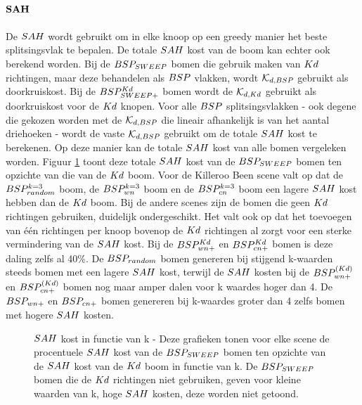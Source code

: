 \paragraph{$\mathbf{SAH}$}
De $\symSAH$ wordt gebruikt om in elke knoop op een greedy manier het beste splitsingsvlak te bepalen. De totale $\symSAH$ kost van de boom kan echter ook berekend worden. Bij de $BSP_{SWEEP}$ bomen die gebruik maken van $Kd$ richtingen, maar deze behandelen als $BSP$ vlakken, wordt $\mathcal{K}_{d,BSP}$ gebruikt als doorkruiskost. Bij de $BSP^{Kd}_{SWEEP+}$ bomen wordt de $\mathcal{K}_{d,Kd}$ gebruikt als doorkruiskost voor de $Kd$ knopen. Voor alle $BSP$ splitsingsvlakken - ook degene die gekozen worden met de $\mathcal{K}_{d,BSP}$ die lineair afhankelijk is van het aantal driehoeken - wordt de vaste $\mathcal{K}_{d,BSP}$ gebruikt om de totale $\symSAH$ kost te berekenen.
Op deze manier kan de totale $\symSAH$ kost van alle bomen vergeleken worden.
Figuur \ref{fig:k-sah} toont deze totale $\symSAH$ kost van de $BSP_{SWEEP}$ bomen ten opzichte van die van de $Kd$ boom. 
Voor de Killeroo Been scene valt op dat de $BSP_{random}^{k=3}$ boom, de $BSP_{wn}^{k=3}$ boom en de $BSP_{cn}^{k=3}$ boom een lagere $\symSAH$ kost hebben dan de $Kd$ boom.
Bij de andere scenes zijn de bomen die geen $Kd$ richtingen gebruiken, duidelijk ondergeschikt.
Het valt ook op dat het toevoegen van één richtingen per knoop bovenop de $Kd$ richtingen al zorgt voor een sterke vermindering van de $\symSAH$ kost.
Bij de $BSP^{Kd}_{wn+}$ en $BSP^{Kd}_{cn+}$ bomen is deze daling zelfs al 40\%.
De $BSP_{random}$ bomen genereren bij stijgend k-waarden steeds bomen met een lagere $\symSAH$ kost, terwijl de $\symSAH$ kosten bij de $BSP^{(Kd)}_{wn+}$ en $BSP^{(Kd)}_{cn+}$ bomen nog maar amper dalen voor k waardes hoger dan 4. De $BSP_{wn+}$ en $BSP_{cn+}$ bomen genereren bij k-waardes groter dan 4 zelfs bomen met hogere $\symSAH$ kosten. 
\begin{figure}[h]
  \centering
  \begin{subfigure}[t]{.32\linewidth}
    \centering
{}
  \end{subfigure}
  \begin{subfigure}[t]{.32\linewidth}
    \centering
{}
\end{subfigure}
\begin{subfigure}[t]{.32\linewidth}
  \centering
{}
\end{subfigure}
\caption[$\symSAH$ kost in functie van k]{$\symSAH$ kost in functie van k - \small Deze grafieken tonen voor elke scene de procentuele $\symSAH$ kost van de $BSP_{SWEEP}$ bomen ten opzichte van de $\symSAH$ kost van de $Kd$ boom in functie van k. De $BSP_{SWEEP}$ bomen die de $Kd$ richtingen niet gebruiken, geven voor kleine waarden van k, hoge $\symSAH$ kosten, deze worden niet getoond.}
\label{fig:k-sah}
\end{figure}
